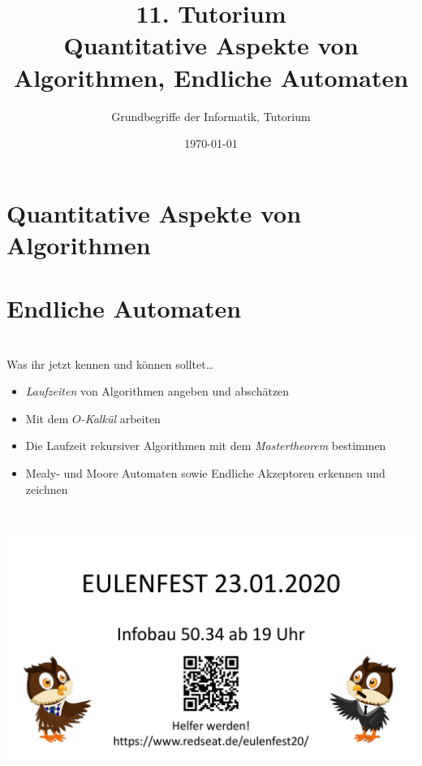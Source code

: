 




\usetikzlibrary{matrix}
\usetikzlibrary{arrows.meta}
\usetikzlibrary{automata}
\usetikzlibrary{tikzmark}

\title[Quantitative Aspekte von Algorithmen, Endliche Automaten]{11. Tutorium\\  Quantitative Aspekte von Algorithmen, Endliche Automaten}
\subtitle{Grundbegriffe der Informatik, Tutorium \hashtag\mytutnumber}
\date{\today}



\titleframe
\roadmap


\section{Quantitative Aspekte von Algorithmen}


\section{Endliche Automaten}


\section{}
	\begin{frame}{Was ihr jetzt kennen und können solltet\dots}
			\begin{itemize}
				\item \emph{Laufzeiten} von Algorithmen angeben und abschätzen
				\item Mit dem \emph{$O$-Kalkül} arbeiten
				\item Die Laufzeit rekursiver Algorithmen mit dem \emph{Mastertheorem} bestimmen
				\item Mealy- und Moore Automaten sowie Endliche Akzeptoren erkennen und zeichnen
			\end{itemize}
	
	\end{frame}
\section{}
\includegraphics[width=1\textwidth]{../figures/EulenfestWerbung.pdf}
\questionframe
\lastframe
{}

